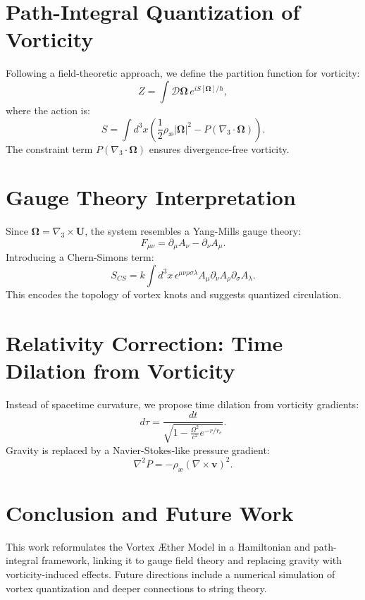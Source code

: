 \documentclass[12pt]{article}
\begin{document}
    \section{Path-Integral Quantization of Vorticity}
    Following a field-theoretic approach, we define the partition function for vorticity:
        \begin{equation}
           Z = \int \mathcal{D} \boldsymbol{\Omega} \, e^{i S[\boldsymbol{\Omega}] / \hbar},
        \end{equation}
    where the action is:
        \begin{equation}
            S = \int d^3x \left( \frac{1}{2} \rho_{\text{\ae}} |\boldsymbol{\Omega}|^2 - P (\nabla_3 \cdot \boldsymbol{\Omega}) \right).
        \end{equation}
    The constraint term $P (\nabla_3 \cdot \boldsymbol{\Omega})$ ensures divergence-free vorticity.

    \section{Gauge Theory Interpretation}
    Since $\boldsymbol{\Omega} = \nabla_3 \times \mathbf{U}$, the system resembles a Yang-Mills gauge theory:
        \begin{equation}
        F_{\mu\nu} = \partial_\mu A_\nu - \partial_\nu A_\mu.
        \end{equation}
    Introducing a Chern-Simons term:
        \begin{equation}
        S_{CS} = k \int d^3x \, \epsilon^{\mu\nu\rho\sigma\lambda} A_\mu \partial_\nu A_\rho \partial_\sigma A_\lambda.
        \end{equation}
    This encodes the topology of vortex knots and suggests quantized circulation.

    \section{Relativity Correction: Time Dilation from Vorticity}
    Instead of spacetime curvature, we propose time dilation from vorticity gradients:
        \begin{equation}
         d\tau = \frac{dt}{\sqrt{1 - \frac{\Omega^2}{c^2} e^{-r/r_c}}}.
        \end{equation}
    Gravity is replaced by a Navier-Stokes-like pressure gradient:
        \begin{equation}
          \nabla^2 P = -\rho_{\text{\ae}} (\nabla \times \mathbf{v})^2.
        \end{equation}

    \section{Conclusion and Future Work}
    This work reformulates the Vortex Æther Model in a Hamiltonian and path-integral framework, linking it to gauge field theory and replacing gravity with vorticity-induced effects. Future directions include a numerical simulation of vortex quantization and deeper connections to string theory.
\end{document}
